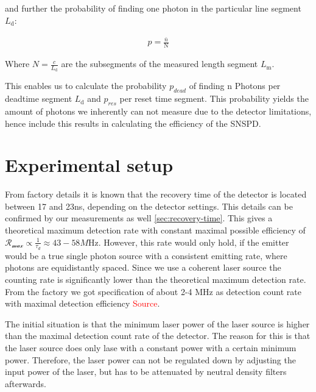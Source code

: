 and further the probability of finding one photon in the particular line segment $L_{\text{d}}$:

\begin{align}
    p = \frac{\bar{n}}{\text{N}}
\end{align}

Where $N = \frac{c}{L_{\text{d}}}$ are the subsegments of the measured length segment $L_{\text{m}}$.

This enables us to calculate the probability $p_{dead}$ of finding n Photons per deadtime segment $L_{\text{d}}$ and
$p_{res}$ per reset time segment.
This probability yields the amount of photons we inherently can not measure due to the detector limitations, hence include
this results in calculating the efficiency of the SNSPD.

\section{Experimental setup}

From factory details it is known that the recovery time of the detector is located between 17 and 23ns, depending on the
detector settings.
This details can be confirmed by our measurements as well \ref{sec:recovery-time}.
This gives a theoretical maximum detection rate with constant maximal possible efficiency of $\mathcal{R_{\max}} \propto \frac{1}{\tau_{d}} \approx 43-58\si{M\Hz}$.
However, this rate would only hold, if the emitter would be a true single photon source with a consistent emitting rate, where
photons are equidistantly spaced.
Since we use a coherent laser source the counting rate is significantly lower than the theoretical maximum detection rate.
From the factory we got specification of about 2-4 MHz as detection count rate with maximal detection efficiency \textcolor{red}{Source}.


The initial situation is that the minimum laser power of the laser source is higher than the maximal detection count rate of the detector.
The reason for this is that the laser source does only lase with a constant power with a certain minimum power.
Therefore, the laser power can not be regulated down by adjusting the input power of the laser, but has to be attenuated
by neutral density filters afterwards.

